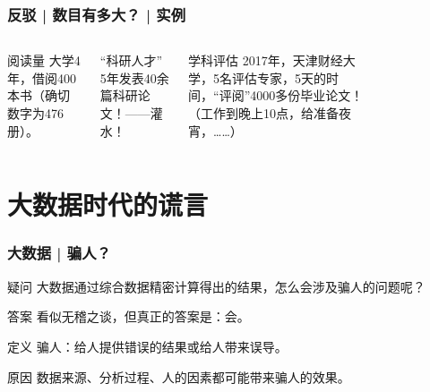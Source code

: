\begin{frame}
  \frametitle{反驳 | 数目有多大？ | 实例}
  \begin{columns}
  \begin{block}{阅读量}
    大学4年，借阅400本书（确切数字为476册）。
  \end{block}
  \pause
  \pause
  \begin{block}{“科研人才”}
    5年发表40余篇科研论文！——灌水！
  \end{block}
  \pause
  \begin{block}{学科评估}
    2017年，天津财经大学，5名评估专家，5天的时间，“评阅”4000多份毕业论文！（工作到晚上10点，给准备夜宵，……）
  \end{block}
    \begin{figure}
      \centering
    \end{figure}
  \end{columns}
\end{frame}

\section{大数据时代的谎言}
\begin{frame}
  \frametitle{大数据 | 骗人？}
  \begin{block}{疑问}
    大数据通过综合数据精密计算得出的结果，怎么会涉及骗人的问题呢？
  \end{block}
  \pause
  \begin{block}{答案}
    看似无稽之谈，但真正的答案是：\alert{会}。
  \end{block}
  \pause
  \begin{block}{定义}
    骗人：给人提供错误的结果或给人带来误导。
  \end{block}
  \pause
  \begin{block}{原因}
    数据来源、分析过程、人的因素都可能带来骗人的效果。
  \end{block}
\end{frame}

